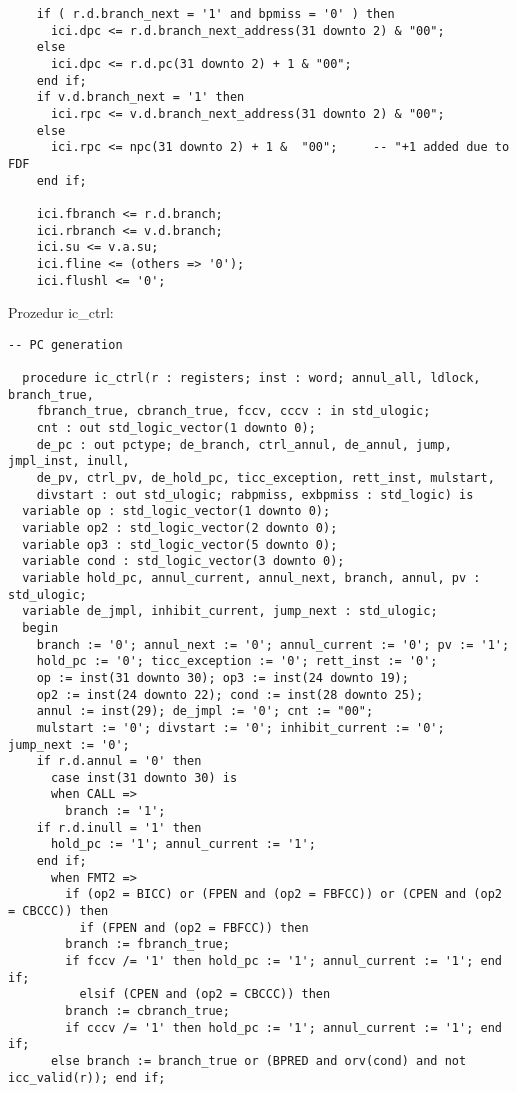 \begin{lstlisting}
	if ( r.d.branch_next = '1' and bpmiss = '0' ) then
	  ici.dpc <= r.d.branch_next_address(31 downto 2) & "00";	  	  
	else
      ici.dpc <= r.d.pc(31 downto 2) + 1 & "00";
 	end if;
  	if v.d.branch_next = '1' then
  	  ici.rpc <= v.d.branch_next_address(31 downto 2) & "00";
   	else
   	  ici.rpc <= npc(31 downto 2) + 1 &  "00";     -- "+1 added due to FDF
   	end if;
   	
   	ici.fbranch <= r.d.branch;
    ici.rbranch <= v.d.branch;
    ici.su <= v.a.su;
    ici.fline <= (others => '0');
    ici.flushl <= '0';
\end{lstlisting}

Prozedur ic\_ctrl:

\begin{lstlisting}
-- PC generation

  procedure ic_ctrl(r : registers; inst : word; annul_all, ldlock, branch_true, 
	fbranch_true, cbranch_true, fccv, cccv : in std_ulogic; 
	cnt : out std_logic_vector(1 downto 0); 
	de_pc : out pctype; de_branch, ctrl_annul, de_annul, jump, jmpl_inst, inull, 
	de_pv, ctrl_pv, de_hold_pc, ticc_exception, rett_inst, mulstart,
	divstart : out std_ulogic; rabpmiss, exbpmiss : std_logic) is
  variable op : std_logic_vector(1 downto 0);
  variable op2 : std_logic_vector(2 downto 0);
  variable op3 : std_logic_vector(5 downto 0);
  variable cond : std_logic_vector(3 downto 0);
  variable hold_pc, annul_current, annul_next, branch, annul, pv : std_ulogic;
  variable de_jmpl, inhibit_current, jump_next : std_ulogic;
  begin
    branch := '0'; annul_next := '0'; annul_current := '0'; pv := '1';
    hold_pc := '0'; ticc_exception := '0'; rett_inst := '0';
    op := inst(31 downto 30); op3 := inst(24 downto 19); 
    op2 := inst(24 downto 22); cond := inst(28 downto 25); 
    annul := inst(29); de_jmpl := '0'; cnt := "00";
    mulstart := '0'; divstart := '0'; inhibit_current := '0'; jump_next := '0';
    if r.d.annul = '0' then
      case inst(31 downto 30) is
      when CALL =>
        branch := '1';
	if r.d.inull = '1' then 
	  hold_pc := '1'; annul_current := '1';
 	end if;
      when FMT2 =>
        if (op2 = BICC) or (FPEN and (op2 = FBFCC)) or (CPEN and (op2 = CBCCC)) then
          if (FPEN and (op2 = FBFCC)) then 
	    branch := fbranch_true;
	    if fccv /= '1' then hold_pc := '1'; annul_current := '1'; end if;
          elsif (CPEN and (op2 = CBCCC)) then 
	    branch := cbranch_true;
	    if cccv /= '1' then hold_pc := '1'; annul_current := '1'; end if;
	  else branch := branch_true or (BPRED and orv(cond) and not icc_valid(r)); end if;

\end{lstlisting}
